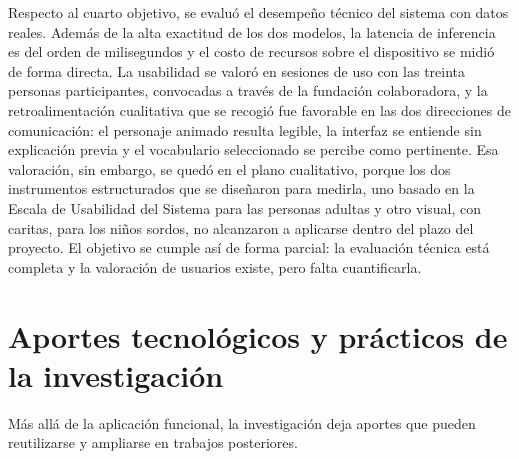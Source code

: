 Respecto al cuarto objetivo, se evaluó el desempeño técnico del sistema con datos reales. Además de la alta exactitud de los dos modelos, la latencia de inferencia es del orden de milisegundos y el costo de recursos sobre el dispositivo se midió de forma directa. La usabilidad se valoró en sesiones de uso con las treinta personas participantes, convocadas a través de la fundación colaboradora, y la retroalimentación cualitativa que se recogió fue favorable en las dos direcciones de comunicación: el personaje animado resulta legible, la interfaz se entiende sin explicación previa y el vocabulario seleccionado se percibe como pertinente. Esa valoración, sin embargo, se quedó en el plano cualitativo, porque los dos instrumentos estructurados que se diseñaron para medirla, uno basado en la Escala de Usabilidad del Sistema para las personas adultas y otro visual, con caritas, para los niños sordos, no alcanzaron a aplicarse dentro del plazo del proyecto. El objetivo se cumple así de forma parcial: la evaluación técnica está completa y la valoración de usuarios existe, pero falta cuantificarla.

\section{Aportes tecnológicos y prácticos de la investigación}

Más allá de la aplicación funcional, la investigación deja aportes que pueden reutilizarse y ampliarse en trabajos posteriores.

